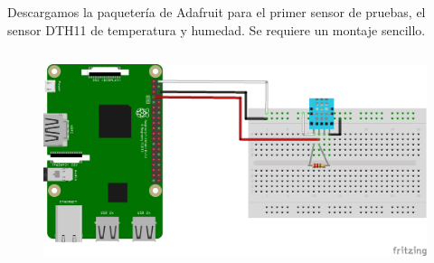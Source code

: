 Descargamos la paquetería de Adafruit para el primer sensor de pruebas, el sensor DTH11 de temperatura y humedad.
Se requiere un montaje sencillo.
\begin{figure}[hbt!]
\centering
\includegraphics[height=2.5in]{figures/nodo_1.png}
\end{figure}

